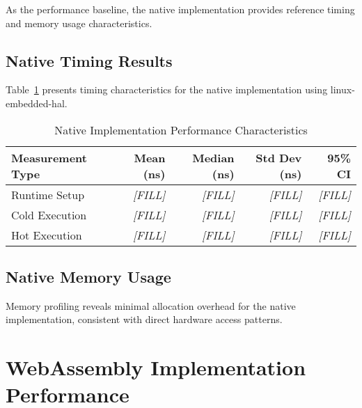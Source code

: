 As the performance baseline, the native implementation provides reference timing and memory usage characteristics.

\subsection{Native Timing Results}
\label{subsec:native-timing}

Table~\ref{tab:native-performance} presents timing characteristics for the native implementation using linux-embedded-hal.

\begin{table}[htbp]
\centering
\caption{Native Implementation Performance Characteristics}
\label{tab:native-performance}
\begin{tabular}{lrrrr}
\toprule
\textbf{Measurement Type} & \textbf{Mean (ns)} & \textbf{Median (ns)} & \textbf{Std Dev (ns)} & \textbf{95\% CI} \\
\midrule
Runtime Setup    & \textit{[FILL]} & \textit{[FILL]} & \textit{[FILL]} & \textit{[FILL]} \\
Cold Execution   & \textit{[FILL]} & \textit{[FILL]} & \textit{[FILL]} & \textit{[FILL]} \\
Hot Execution    & \textit{[FILL]} & \textit{[FILL]} & \textit{[FILL]} & \textit{[FILL]} \\
\bottomrule
\end{tabular}
\end{table}


\subsection{Native Memory Usage}
\label{subsec:native-memory}

Memory profiling reveals minimal allocation overhead for the native implementation, consistent with direct hardware access patterns.

\section{WebAssembly Implementation Performance}
\label{sec:wasm-performance}

